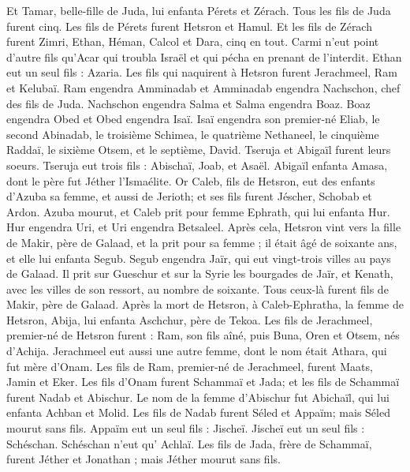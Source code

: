 \begin{multicols}{2}
Et Tamar, belle-fille de Juda, lui enfanta Pérets et Zérach. Tous les fils de Juda furent cinq.
Les fils de Pérets furent Hetsron et Hamul.
Et les fils de Zérach furent Zimri, Ethan, Héman, Calcol et Dara, cinq en tout.
Carmi n'eut point d’autre fils qu'Acar qui troubla Israël et qui pécha en prenant de l'interdit.
Ethan eut un seul fils : Azaria.
Les fils qui naquirent à Hetsron furent Jerachmeel, Ram et Kelubaï.
Ram engendra Amminadab et Amminadab engendra Nachschon, chef des fils de Juda.
Nachschon engendra Salma et Salma engendra Boaz.
Boaz engendra Obed et Obed engendra Isaï.
Isaï engendra son premier-né Eliab, le second Abinadab, le troisième Schimea,
le quatrième Nethaneel, le cinquième Raddaï,
le sixième Otsem, et le septième, David.
Tseruja et Abigaïl furent leurs soeurs. Tseruja eut trois fils : Abischaï, Joab, et Asaël.
Abigaïl enfanta Amasa, dont le père fut Jéther l’Ismaélite.
Or Caleb, fils de Hetsron, eut des enfants d’Azuba sa femme, et aussi de Jerioth; et ses fils furent Jéscher, Schobab et Ardon.
Azuba mourut, et Caleb prit pour femme Ephrath, qui lui enfanta Hur.
Hur engendra Uri, et Uri engendra Betsaleel.
Après cela, Hetsron vint vers la fille de Makir, père de Galaad, et la prit pour sa femme ; il était âgé de soixante ans, et elle lui enfanta Segub.
Segub engendra Jaïr, qui eut vingt-trois villes au pays de Galaad.
Il prit sur Gueschur et sur la Syrie les bourgades de Jaïr, et Kenath, avec les villes de son ressort, au nombre de soixante. Tous ceux-là furent fils de Makir, père de Galaad.
Après la mort de Hetsron, à Caleb-Ephratha, la femme de Hetsron, Abija, lui enfanta Aschchur, père de Tekoa.
Les fils de Jerachmeel, premier-né de Hetsron furent : Ram, son fils aîné, puis Buna, Oren et Otsem, nés d'Achija.
Jerachmeel eut aussi une autre femme, dont le nom était Athara, qui fut mère d'Onam.
Les fils de Ram, premier-né de Jerachmeel, furent Maats, Jamin et Eker.
Les fils  d'Onam furent  Schammaï et Jada; et les fils de Schammaï furent  Nadab et Abischur.
Le nom de la femme d'Abischur fut Abichaïl, qui lui enfanta Achban et Molid.
Les fils de Nadab furent Séled et Appaïm; mais Séled mourut sans fils.
Appaïm eut un seul fils : Jischeï. Jischeï eut un seul fils : Schéschan. Schéschan n'eut qu' Achlaï.
Les fils de Jada, frère de Schammaï, furent Jéther et Jonathan ; mais Jéther mourut sans fils.

\end{multicols}
